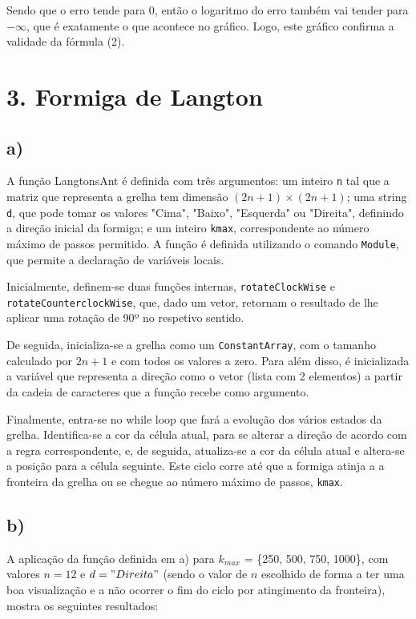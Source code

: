 \documentclass[12pt,a4paper]{article}
\begin{document}
        Sendo que o erro tende para 0, então o logaritmo do erro também vai tender para \(-\infty\), que é exatamente o que acontece no gráfico. Logo, este gráfico confirma a validade da fórmula (2).
    
    \newpage
    \section{3. Formiga de Langton}
    \subsection{a)}
        A função LangtonsAnt é definida com três argumentos: um inteiro \texttt{n} tal que a matriz que representa a grelha tem dimensão \((2n+1) \times (2n+1)\); uma string \texttt{d}, que pode tomar os valores "Cima", "Baixo", "Esquerda" ou "Direita", definindo a direção inicial da formiga; e um inteiro \texttt{kmax}, correspondente ao número máximo de passos permitido. A função é definida utilizando o comando \texttt{Module}, que permite a declaração de variáveis locais.
        
        Inicialmente, definem-se duas funções internas, \texttt{rotateClockWise} e \texttt{rotateCounterclockWise}, que, dado um vetor, retornam o resultado de lhe aplicar uma rotação de 90º no respetivo sentido.
        
        De seguida, inicializa-se a grelha como um \texttt{ConstantArray}, com o tamanho calculado por \(2n+1\) e com todos os valores a zero. Para além disso, é inicializada a variável que representa a direção como o vetor (lista com 2 elementos) a partir da cadeia de caracteres que a função recebe como argumento.
        
        Finalmente, entra-se no while loop que fará a evolução dos vários estados da grelha. Identifica-se a cor da célula atual, para se alterar a direção de acordo com a regra correspondente, e, de seguida, atualiza-se a cor da célula atual e altera-se a posição para a célula seguinte. Este ciclo corre até que a formiga atinja a a fronteira da grelha ou se chegue ao número máximo de passos, \texttt{kmax}.

    \subsection{b)}
        A aplicação da função definida em a) para \(k_{max}\) = \{250, 500, 750, 1000\}, com valores \(n = 12\) e \(d = "Direita"\) (sendo o valor de \(n\) escolhido de forma a ter uma boa visualização e a não ocorrer o fim do ciclo por atingimento da fronteira), mostra os seguintes resultados: \\
        
\end{document}
